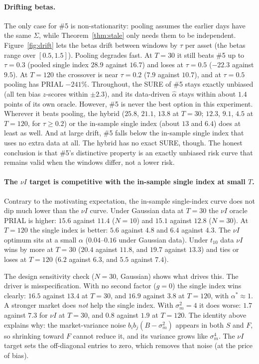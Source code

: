 \documentclass[11pt]{article}
\theoremstyle{remark}
\begin{document}
\paragraph{Drifting betas.}
The only case for \#5 is non-stationarity: pooling assumes the earlier days have the same $\Sigma$, while Theorem~\ref{thm:stale} only needs them to be independent. Figure~\ref{fig:drift} lets the betas drift between windows by $\tau$ per asset (the betas range over $[0.5, 1.5]$). Pooling degrades fast. At $T = 30$ it still beats \#5 up to $\tau = 0.3$ (pooled single index $28.9$ against $16.7$) and loses at $\tau = 0.5$ ($-22.3$ against $9.5$). At $T = 120$ the crossover is near $\tau = 0.2$ ($7.9$ against $10.7$), and at $\tau = 0.5$ pooling has PRIAL $-241\%$. Throughout, the SURE of \#5 stays exactly unbiased (all ten bias $z$-scores within $\pm2.3$), and its data-driven $\hat\alpha$ stays within about $1.4$ points of its own oracle. However, \#5 is never the best option in this experiment. Wherever it beats pooling, the hybrid ($25.8$, $21.1$, $13.8$ at $T = 30$; $12.3$, $9.1$, $4.5$ at $T = 120$, for $\tau \ge 0.2$) or the in-sample single index (about $13$ and $6.4$) does at least as well. And at large drift, \#5 falls below the in-sample single index that uses no extra data at all. The hybrid has no exact SURE, though. The honest conclusion is that \#5's distinctive property is an exactly unbiased risk curve that remains valid when the windows differ, not a lower risk.

\paragraph{The $\nu I$ target is competitive with the in-sample single index at small $T$.}
Contrary to the motivating expectation, the in-sample single-index curve does not dip much lower than the $\nu I$ curve. Under Gaussian data at $T = 30$ the $\nu I$ oracle PRIAL is higher: $15.6$ against $11.4$ ($N = 10$) and $15.1$ against $12.8$ ($N = 30$). At $T = 120$ the single index is better: $5.6$ against $4.8$ and $6.4$ against $4.3$. The $\nu I$ optimum sits at a small $\alpha$ ($0.04$--$0.16$ under Gaussian data). Under $t_{10}$ data $\nu I$ wins by more at $T = 30$ ($20.4$ against $11.8$, and $19.7$ against $13.3$) and ties or loses at $T = 120$ ($6.2$ against $6.3$, and $5.5$ against $7.4$).

The design sensitivity check ($N = 30$, Gaussian) shows what drives this. The driver is misspecification. With no second factor ($g = 0$) the single index wins clearly: $16.5$ against $13.4$ at $T = 30$, and $16.9$ against $3.8$ at $T = 120$, with $\alpha^* \approx 1$. A stronger market does \emph{not} help the single index. With $\sigma_m^2 = 4$ it does worse: $1.7$ against $7.3$ for $\nu I$ at $T = 30$, and $0.8$ against $1.9$ at $T = 120$. The identity above explains why: the market-variance noise $b_ib_j(B - \sigma_m^2)$ appears in both $S$ and $F$, so shrinking toward $F$ cannot reduce it, and its variance grows like $\sigma_m^4$. The $\nu I$ target sets the off-diagonal entries to zero, which removes that noise (at the price of bias).
\end{document}
